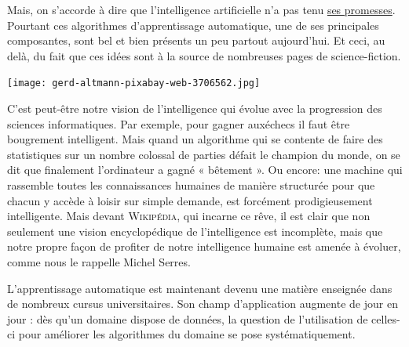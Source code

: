 Mais, on s’accorde à dire que l’intelligence artificielle n’a pas tenu \href{http://www.scilogs.fr/intelligence-mecanique/lintelligence-artificielle-naura-pas-lieu/}{ses promesses}. Pourtant ces algorithmes d’apprentissage automatique, une de ses principales composantes, sont bel et bien présents un peu partout aujourd’hui. Et ceci, au delà, du fait que ces idées sont à la source de nombreuses pages de science-fiction.

\begin{jazzgraphic*}
\texttt{[image: gerd-altmann-pixabay-web-3706562.jpg]}
\end{jazzgraphic*}

C’est peut-être notre vision de l’intelligence qui évolue avec la progression des sciences informatiques. Par exemple, pour gagner aux\linebreak échecs il faut être bougrement intelligent. Mais quand un algorithme qui se contente de faire des statistiques sur un nombre colossal de parties défait le champion du monde, on se dit que finalement l’ordinateur a gagné « bêtement ». Ou encore: une machine qui rassemble toutes les connaissances humaines de manière structurée pour que chacun y accède à loisir sur simple demande, est forcément prodigieusement intelligente. Mais devant \textsc{Wikipédia}, qui incarne ce rêve, il est clair que non seulement une vision encyclopédique de l’intelligence est incomplète, mais que notre propre façon de profiter de notre intelligence humaine est amenée à évoluer, comme nous le rappelle Michel Serres.


L’apprentissage automatique est maintenant devenu une matière enseignée dans de nombreux cursus universitaires. Son champ d’application augmente de jour en jour : dès qu’un domaine dispose de données, la question de l’utilisation de celles-ci pour améliorer les algorithmes du domaine se pose systématiquement.

